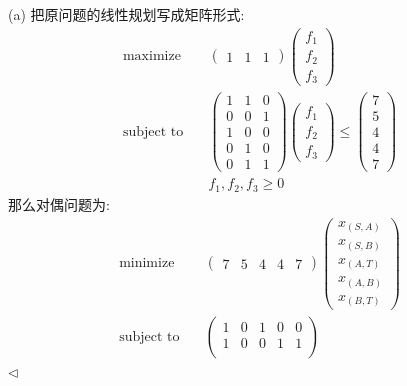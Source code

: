 \documentclass[11pt]{article}
\newenvironment{answer}[1][Answer]{\begin{trivlist}
\item[\hskip \labelsep{\bfseries\itshape#1.}\hskip \labelsep]}{\hfill$\lhd$\end{trivlist}}
\DeclareMathOperator*{\minimize}{minimize}
\DeclareMathOperator*{\maximize}{maximize}
\begin{document}
\begin{answer}
   (a) 把原问题的线性规划写成矩阵形式:
   \begin{align*}
    \maximize \quad&
    \begin{pmatrix} 
        1 & 1 & 1
    \end{pmatrix} \begin{pmatrix}
        f_1\\
        f_2\\
        f_3
    \end{pmatrix} 
    \\ \text{subject to} \quad &
    \begin{pmatrix}
        1 & 1 & 0 \\
        0 & 0 & 1 \\
        1 & 0 & 0 \\
        0 & 1 & 0 \\
        0 & 1 & 1 
    \end{pmatrix} \begin{pmatrix}
        f_1 \\
        f_2 \\
        f_3
    \end{pmatrix} \le \begin{pmatrix}
        7 \\
        5 \\
        4 \\
        4 \\
        7
    \end{pmatrix} \\
    & f_1, f_2, f_3 \ge 0
   \end{align*} 
    那么对偶问题为:
    \begin{align*}
        \minimize \quad&
        \begin{pmatrix}
            7 & 5 & 4 & 4 & 7
        \end{pmatrix} \begin{pmatrix}
            x_{(S,A)} \\
            x_{(S,B)} \\
            x_{(A,T)} \\
            x_{(A,B)} \\
            x_{(B,T)}
        \end{pmatrix} \\    
        \text{subject to} \quad
        & \begin{pmatrix}
            1 & 0 & 1 & 0 & 0 \\
            1 & 0 & 0 & 1 & 1 \\

\end{pmatrix}
\end{align*}
\end{answer}
\end{document}
